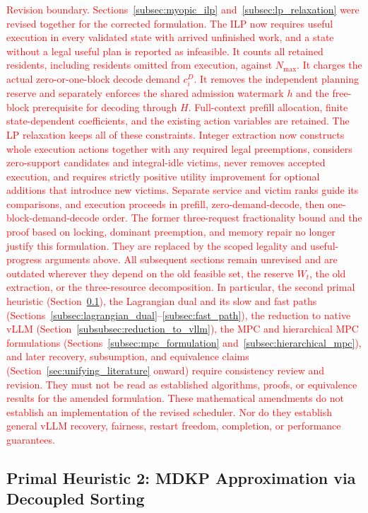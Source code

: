 \documentclass[11pt]{article}
\begin{document}
\textcolor{red}{Revision boundary. Sections~\ref{subsec:myopic_ilp} and~\ref{subsec:lp_relaxation} were revised together for the corrected formulation. The ILP now requires useful execution in every validated state with arrived unfinished work, and a state without a legal useful plan is reported as infeasible. It counts all retained residents, including residents omitted from execution, against \(N_{\max}\). It charges the actual zero-or-one-block decode demand \(c_i^D\). It removes the independent planning reserve and separately enforces the shared admission watermark \(h\) and the free-block prerequisite for decoding through \(H\). Full-context prefill allocation, finite state-dependent coefficients, and the existing action variables are retained. The LP relaxation keeps all of these constraints. Integer extraction now constructs whole execution actions together with any required legal preemptions, considers zero-support candidates and integral-idle victims, never removes accepted execution, and requires strictly positive utility improvement for optional additions that introduce new victims. Separate service and victim ranks guide its comparisons, and execution proceeds in prefill, zero-demand-decode, then one-block-demand-decode order. The former three-request fractionality bound and the proof based on locking, dominant preemption, and memory repair no longer justify this formulation. They are replaced by the scoped legality and useful-progress arguments above. All subsequent sections remain unrevised and are outdated wherever they depend on the old feasible set, the reserve \(W_t\), the old extraction, or the three-resource decomposition. In particular, the second primal heuristic (Section~\ref{subsec:primal_greedy}), the Lagrangian dual and its slow and fast paths (Sections~\ref{subsec:lagrangian_dual}--\ref{subsec:fast_path}), the reduction to native vLLM (Section~\ref{subsubsec:reduction_to_vllm}), the MPC and hierarchical MPC formulations (Sections~\ref{subsec:mpc_formulation} and~\ref{subsec:hierarchical_mpc}), and later recovery, subsumption, and equivalence claims (Section~\ref{sec:unifying_literature} onward) require consistency review and revision. They must not be read as established algorithms, proofs, or equivalence results for the amended formulation. These mathematical amendments do not establish an implementation of the revised scheduler. Nor do they establish general vLLM recovery, fairness, restart freedom, completion, or performance guarantees.}


\subsection{Primal Heuristic 2: MDKP Approximation via Decoupled Sorting}
\label{subsec:primal_greedy}
\end{document}
